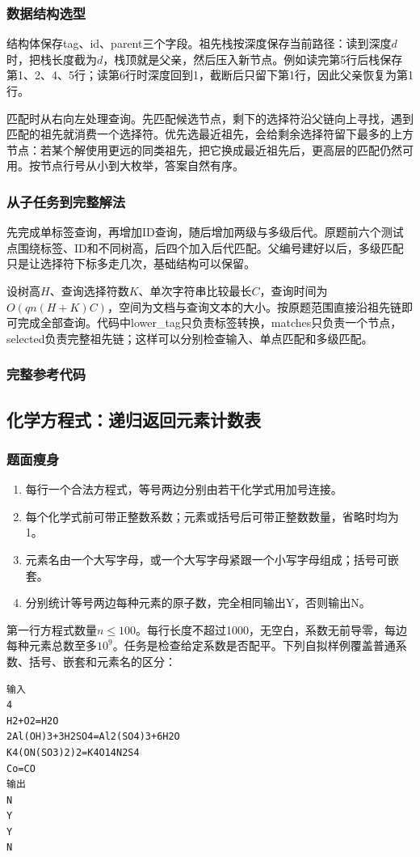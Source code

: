 \subsubsection{数据结构选型}
结构体保存tag、id、parent三个字段。祖先栈按深度保存当前路径：读到深度$d$时，把栈长度截为$d$，栈顶就是父亲，然后压入新节点。例如读完第5行后栈保存第1、2、4、5行；读第6行时深度回到1，截断后只留下第1行，因此父亲恢复为第1行。

匹配时从右向左处理查询。先匹配候选节点，剩下的选择符沿父链向上寻找，遇到匹配的祖先就消费一个选择符。优先选最近祖先，会给剩余选择符留下最多的上方节点：若某个解使用更远的同类祖先，把它换成最近祖先后，更高层的匹配仍然可用。按节点行号从小到大枚举，答案自然有序。

\subsubsection{从子任务到完整解法}
先完成单标签查询，再增加ID查询，随后增加两级与多级后代。原题前六个测试点围绕标签、ID和不同树高，后四个加入后代匹配。父编号建好以后，多级匹配只是让选择符下标多走几次，基础结构可以保留。

设树高$H$、查询选择符数$K$、单次字符串比较最长$C$，查询时间为$O(qn(H+K)C)$，空间为文档与查询文本的大小。按原题范围直接沿祖先链即可完成全部查询。代码中lower\_tag只负责标签转换，matches只负责一个节点，selected负责完整祖先链；这样可以分别检查输入、单点匹配和多级匹配。

\subsubsection{完整参考代码}

\subsection{化学方程式：递归返回元素计数表}
\subsubsection{题面瘦身}
\begin{enumerate}
\item 每行一个合法方程式，等号两边分别由若干化学式用加号连接。
\item 每个化学式前可带正整数系数；元素或括号后可带正整数数量，省略时均为1。
\item 元素名由一个大写字母，或一个大写字母紧跟一个小写字母组成；括号可嵌套。
\item 分别统计等号两边每种元素的原子数，完全相同输出Y，否则输出N。
\end{enumerate}
第一行方程式数量$n\le100$。每行长度不超过1000，无空白，系数无前导零，每边每种元素总数至多$10^9$。任务是检查给定系数是否配平。下列自拟样例覆盖普通系数、括号、嵌套和元素名的区分：
\begin{verbatim}
输入
4
H2+O2=H2O
2Al(OH)3+3H2SO4=Al2(SO4)3+6H2O
K4(ON(SO3)2)2=K4O14N2S4
Co=CO
输出
N
Y
Y
N
\end{verbatim}

